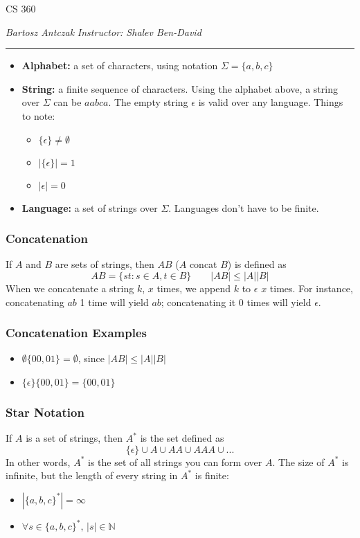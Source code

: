 \documentclass{report}
\newcommand{\course}{CS 360}
\newcommand{\instructor}{Shalev Ben-David}
\begin{document}
\begin{center}
\begin{Large}
\textsc{\course{}}
\end{Large}
\end{center} 
\noindent \textit{Bartosz Antczak} \hfill
\textit{Instructor: \instructor{}}
\rule{\textwidth}{0.4pt}
\begin{itemize}
\item \textbf{Alphabet:} a set of characters, using notation $\Sigma = \{a, b, c\}$
\item \textbf{String:} a finite sequence of characters. Using the alphabet above, a string over $\Sigma$ can be $aabca$. The empty string $\epsilon$ is valid over any language. Things to note:
\begin{itemize}
\item $\{\epsilon\} \neq \emptyset$
\item $|\{\epsilon\}| = 1$
\item $|\epsilon| = 0$
\end{itemize}
\item \textbf{Language:} a set of strings over $\Sigma$. Languages don't have to be finite.
\end{itemize}
\subsubsection{Concatenation}
If $A$ and $B$ are sets of strings, then $AB$ ($A$ concat $B$) is defined as
$$AB = \{st : s \in A, t \in B\} \qquad |AB| \leq |A||B|$$
When we concatenate a string $k$, $x$ times, we append $k$ to $\epsilon$ $x$ times. For instance, concatenating $ab$ 1 time will yield $ab$; concatenating it 0 times will yield $\epsilon$.
\subsubsection{Concatenation Examples}
\begin{itemize}
\item $\emptyset\{00, 01\} = \emptyset$, since $|AB| \leq |A||B|$
\item $\{\epsilon\}\{00, 01\} = \{00, 01\}$
\end{itemize}
\subsubsection{Star Notation}
If $A$ is a set of strings, then $A^*$ is the set defined as
$$\{\epsilon\} \cup A \cup AA \cup AAA \cup ...$$
In other words, $A^*$ is the set of all strings you can form over $A$. The size of $A^*$ is infinite, but the length of every string in $A^*$ is finite:
\begin{itemize}
\item $|\{a,b,c\}^*| = \infty$
\item $\forall s \in \{a,b,c\}^*, \, |s| \in \mathbb{N}$
\end{itemize}
\end{document}
